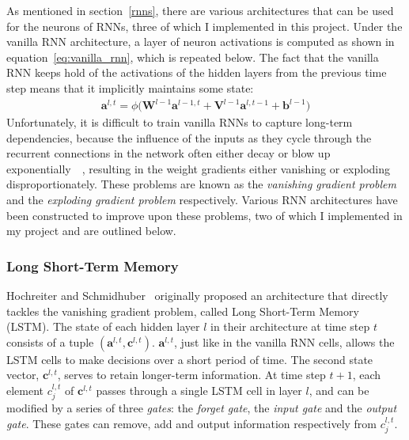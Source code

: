 \documentclass[a4paper, 12pt]{report}
\newcommand{\tit}[1]{\textit{#1}}
\begin{document}
As mentioned in section~\ref{rnns}, there are various architectures that can be used for the neurons of RNNs, three of which I implemented in this project. Under the vanilla RNN architecture, a layer of neuron activations is computed as shown in equation~\ref{eq:vanilla_rnn}, which is repeated below. The fact that the vanilla RNN keeps hold of the activations of the hidden layers from the previous time step means that it implicitly maintains some state:
\begin{gather*}
	\mathbf{a}^{l, t} = \phi \big( \mathbf{W}^{l - 1} \mathbf{a}^{l - 1, t} + \mathbf{V}^{l - 1} \mathbf{a}^{l, t - 1} + \mathbf{b}^{l - 1} \big)
\end{gather*}
Unfortunately, it is difficult to train vanilla RNNs to capture long-term dependencies, because the influence of the inputs as they cycle through the recurrent connections in the network often either decay or blow up exponentially~\cite{vanishing_gradient:hochreiter1991}~\cite{vanishing_gradient:bengio1994}, resulting in the weight gradients either vanishing or exploding disproportionately. These problems are known as the \tit{vanishing gradient problem} and the \tit{exploding gradient problem} respectively. Various RNN architectures have been constructed to improve upon these problems, two of which I implemented in my project and are outlined below.

\subsubsection{Long Short-Term Memory}

Hochreiter and Schmidhuber~\cite{lstm:hochreiter1997} originally proposed an architecture that directly tackles the vanishing gradient problem, called Long Short-Term Memory (LSTM). The state of each hidden layer $l$ in their architecture at time step $t$ consists of a tuple $(\mathbf{a}^{l, t}, \mathbf{c}^{l, t})$. $\mathbf{a}^{l, t}$, just like in the vanilla RNN cells, allows the LSTM cells to make decisions over a short period of time. The second state vector, $\mathbf{c}^{l, t}$, serves to retain longer-term information. At time step $t + 1$, each element $c_j^{l, t}$ of $\mathbf{c}^{l, t}$ passes through a single LSTM cell in layer $l$, and can be modified by a series of three \tit{gates}: the \tit{forget gate}, the \tit{input gate} and the \tit{output gate}. These gates can remove, add and output information respectively from $c_j^{l, t}$. \\
\end{document}
